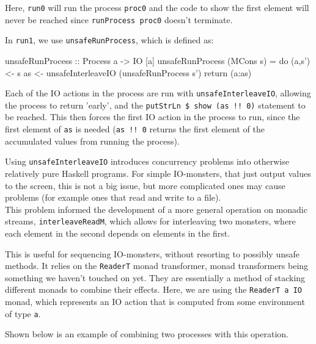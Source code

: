 \documentclass{article}
\begin{document}
Here, \verb+run0+ will run the process \verb+proc0+ and the code to show the first element will never be reached since \verb+runProcess proc0+ doesn't terminate. 

In \verb+run1+, we use \verb+unsafeRunProcess+, which is defined as:

\begin{haskell}
unsafeRunProcess :: Process a -> IO [a]
unsafeRunProcess (MCons s) = 
	do (a,s') <- s
	   as     <- unsafeInterleaveIO (unsafeRunProcess s')
	   return (a:as)
\end{haskell}

Each of the IO actions in the process are run with \verb+unsafeInterleaveIO+, allowing the process to return 'early', and the \verb+putStrLn $ show (as !! 0)+ statement to be reached. This then forces the first IO action in the process to run, since the first element of \verb+as+ is needed (\verb+as !! 0+ returns the first element of the accumulated values from running the process).

Using \verb+unsafeInterleaveIO+ introduces concurrency problems into otherwise relatively pure Haskell programs. For simple IO-monsters, that just output values to the screen, this is not a big issue, but more complicated ones may cause problems (for example ones that read and write to a file). \\

This problem informed the development of a more general operation on monadic streams, \verb+interleaveReadM+, which allows for interleaving two monsters, where each element in the second depends on elements in the first.


This is useful for sequencing IO-monsters, without resorting to possibly unsafe methods. It relies on the \verb+ReaderT+ monad transformer, monad transformers being something we haven't touched on yet. They are essentially a method of stacking different monads to combine their effects. Here, we are using the \verb+ReaderT a IO+ monad, which represents an IO action that is computed from some environment of type \verb+a+. 

Shown below is an example of combining two processes with this operation.
\end{document}
